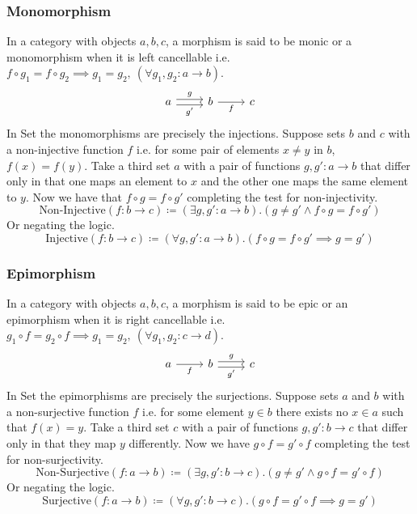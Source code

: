 \subsubsection*{Monomorphism}
In a category with objects $a, b, c$, a morphism is said to be monic or a
monomorphism when it is left cancellable i.e. $f \circ g_1 = f \circ g_2
\implies g_1 = g_2,\ (\forall g_1, g_2:a\to b)$.
\parencite{maclane:working_mathematician}
\[
  \begin{tikzcd} a & b & c
    \arrow["g", shift left=1, from=1-1, to=1-2]
    \arrow["{g'}"', shift right=1, from=1-1, to=1-2]
    \arrow["f"', from=1-2, to=1-3]
  \end{tikzcd}
\]
In Set the monomorphisms are precisely the injections.
Suppose sets $b$ and $c$ with a non-injective function $f$ i.e. for some
pair of elements $x \neq y$ in $b$, $f(x) = f(y)$. Take a third set $a$ with
a pair of functions $g, g':a\to b$ that differ only in that one maps an
element to $x$ and the other one maps the same element to $y$. Now we have
that $f\circ g = f\circ g'$ completing the test for non-injectivity.
\[\text{Non-Injective}(f:b\to c) \coloneq(\exists g, g':a\to b).(g \neq g'
  \land f\circ g = f\circ g')\] Or negating the logic.
\[\text{Injective}(f:b\to c) \coloneq(\forall g, g':a\to b).(f\circ g =
  f\circ g' \implies g=g')\]

\subsubsection*{Epimorphism}
In a category with objects $a, b, c$, a morphism is said to be epic or an
epimorphism when it is right cancellable i.e. $g_1 \circ f = g_2 \circ f
\implies g_1 = g_2,\ (\forall g_1, g_2: c\to d)$.
\parencite{maclane:working_mathematician}
\[
  \begin{tikzcd} a & b & c
    \arrow["{g'}"', shift right=1, from=1-2, to=1-3]
    \arrow["f"', from=1-1, to=1-2]
    \arrow["g", shift left=1, from=1-2, to=1-3]
  \end{tikzcd}
\]
In Set the epimorphisms are precisely the surjections.
Suppose sets $a$ and $b$ with a non-surjective function $f$ i.e. for some
element $y\in b$ there exists no $x\in a$ such that $f(x) = y$. Take a third
set $c$ with a pair of functions $g, g':b\to c$ that differ only in that
they map $y$ differently. Now we have $g\circ f = g'\circ f$ completing the
test for non-surjectivity.
\[\text{Non-Surjective}(f:a\to b) \coloneq(\exists g, g':b\to c).(g \neq g'
  \land g\circ f = g'\circ f)\] Or negating the logic.
\[\text{Surjective}(f:a\to b) \coloneq(\forall g, g':b\to c).(g\circ f =
  g'\circ f \implies g=g')\]

